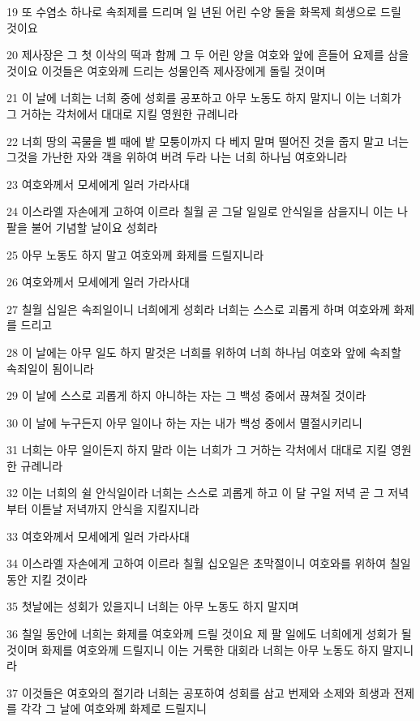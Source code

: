 \par 19 또 수염소 하나로 속죄제를 드리며 일 년된 어린 수양 둘을 화목제 희생으로 드릴 것이요
\par 20 제사장은 그 첫 이삭의 떡과 함께 그 두 어린 양을 여호와 앞에 흔들어 요제를 삼을 것이요 이것들은 여호와께 드리는 성물인즉 제사장에게 돌릴 것이며
\par 21 이 날에 너희는 너희 중에 성회를 공포하고 아무 노동도 하지 말지니 이는 너희가 그 거하는 각처에서 대대로 지킬 영원한 규례니라
\par 22 너희 땅의 곡물을 벨 때에 밭 모퉁이까지 다 베지 말며 떨어진 것을 줍지 말고 너는 그것을 가난한 자와 객을 위하여 버려 두라 나는 너희 하나님 여호와니라
\par 23 여호와께서 모세에게 일러 가라사대
\par 24 이스라엘 자손에게 고하여 이르라 칠월 곧 그달 일일로 안식일을 삼을지니 이는 나팔을 불어 기념할 날이요 성회라
\par 25 아무 노동도 하지 말고 여호와께 화제를 드릴지니라
\par 26 여호와께서 모세에게 일러 가라사대
\par 27 칠월 십일은 속죄일이니 너희에게 성회라 너희는 스스로 괴롭게 하며 여호와께 화제를 드리고
\par 28 이 날에는 아무 일도 하지 말것은 너희를 위하여 너희 하나님 여호와 앞에 속죄할 속죄일이 됨이니라
\par 29 이 날에 스스로 괴롭게 하지 아니하는 자는 그 백성 중에서 끊쳐질 것이라
\par 30 이 날에 누구든지 아무 일이나 하는 자는 내가 백성 중에서 멸절시키리니
\par 31 너희는 아무 일이든지 하지 말라 이는 너희가 그 거하는 각처에서 대대로 지킬 영원한 규례니라
\par 32 이는 너희의 쉴 안식일이라 너희는 스스로 괴롭게 하고 이 달 구일 저녁 곧 그 저녁부터 이튿날 저녁까지 안식을 지킬지니라
\par 33 여호와께서 모세에게 일러 가라사대
\par 34 이스라엘 자손에게 고하여 이르라 칠월 십오일은 초막절이니 여호와를 위하여 칠일 동안 지킬 것이라
\par 35 첫날에는 성회가 있을지니 너희는 아무 노동도 하지 말지며
\par 36 칠일 동안에 너희는 화제를 여호와께 드릴 것이요 제 팔 일에도 너희에게 성회가 될 것이며 화제를 여호와께 드릴지니 이는 거룩한 대회라 너희는 아무 노동도 하지 말지니라
\par 37 이것들은 여호와의 절기라 너희는 공포하여 성회를 삼고 번제와 소제와 희생과 전제를 각각 그 날에 여호와께 화제로 드릴지니
